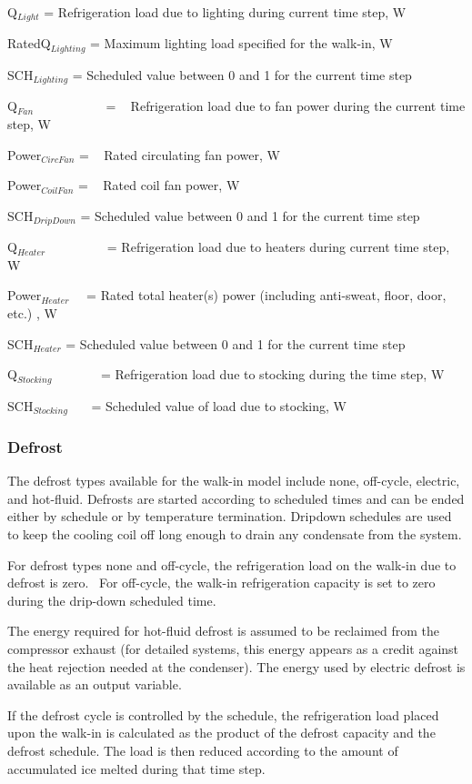 Q\(_{Light}\) = Refrigeration load due to lighting during current time step, W

RatedQ\(_{Lighting}\) = Maximum lighting load specified for the walk-in, W

SCH\(_{Lighting}\) = Scheduled value between 0 and 1 for the current time step

Q\(_{Fan}\) ~~~~~~~~~~ = ~ Refrigeration load due to fan power during the current time step, W

Power\(_{CircFan}\) = ~ Rated circulating fan power, W

Power\(_{CoilFan}\) = ~ Rated coil fan power, W

SCH\(_{DripDown}\) = Scheduled value between 0 and 1 for the current time step

Q\(_{Heater}\)~~~~~~~~~ = Refrigeration load due to heaters during current time step, W

Power\(_{Heater}\)~~ = Rated total heater(s) power (including anti-sweat, floor, door, etc.) , W

SCH\(_{Heater}\) = Scheduled value between 0 and 1 for the current time step

Q\(_{Stocking}\)~~~~~~~ = Refrigeration load due to stocking during the time step, W

SCH\(_{Stocking}\)~~~ = Scheduled value of load due to stocking, W

\subsubsection{Defrost}\label{defrost}

The defrost types available for the walk-in model include none, off-cycle, electric, and hot-fluid. Defrosts are started according to scheduled times and can be ended either by schedule or by temperature termination. Dripdown schedules are used to keep the cooling coil off long enough to drain any condensate from the system.

For defrost types none and off-cycle, the refrigeration load on the walk-in due to defrost is zero.~ For off-cycle, the walk-in refrigeration capacity is set to zero during the drip-down scheduled time.

The energy required for hot-fluid defrost is assumed to be reclaimed from the compressor exhaust (for detailed systems, this energy appears as a credit against the heat rejection needed at the condenser). The energy used by electric defrost is available as an output variable.

If the defrost cycle is controlled by the schedule, the refrigeration load placed upon the walk-in is calculated as the product of the defrost capacity and the defrost schedule. The load is then reduced according to the amount of accumulated ice melted during that time step.

